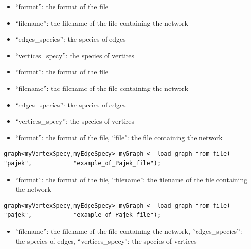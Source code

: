 \documentclass[]{book}
\providecommand{\tightlist}{%
  \setlength{\itemsep}{0pt}\setlength{\parskip}{0pt}}
\theoremstyle{definition}
\theoremstyle{definition}
\theoremstyle{definition}
\theoremstyle{remark}
\begin{document}
\begin{itemize}
\tightlist
\item
  ``format'': the format of the file\\
\item
  ``filename'': the filename of the file containing the network\\
\item
  ``edges\_species'': the species of edges\\
\item
  ``vertices\_specy'': the species of vertices\\
\item
  ``format'': the format of the file\\
\item
  ``filename'': the filename of the file containing the network\\
\item
  ``edges\_species'': the species of edges\\
\item
  ``vertices\_specy'': the species of vertices\\
\item
  ``format'': the format of the file, ``file'': the file containing the
  network
\end{itemize}

\begin{verbatim}
graph<myVertexSpecy,myEdgeSpecy> myGraph <- load_graph_from_file(           "pajek",            "example_of_Pajek_file"); 
\end{verbatim}

\begin{itemize}
\tightlist
\item
  ``format'': the format of the file, ``filename'': the filename of the
  file containing the network
\end{itemize}

\begin{verbatim}
graph<myVertexSpecy,myEdgeSpecy> myGraph <- load_graph_from_file(           "pajek",            "example_of_Pajek_file"); 
\end{verbatim}

\begin{itemize}
\tightlist
\item
  ``filename'': the filename of the file containing the network,
  ``edges\_species'': the species of edges, ``vertices\_specy'': the
  species of vertices
\end{itemize}
\end{document}
